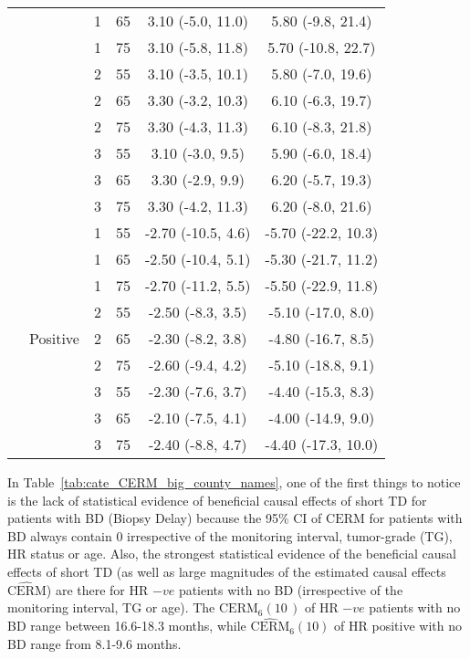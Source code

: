 \documentclass[aoas]{imsart}
\theoremstyle{plain}
\theoremstyle{definition}
\begin{document}
\begin{table}[htbp]
\begin{tabular}{l|l|cccc}
 &  & 1 & 65 & 3.10 (-5.0, 11.0) & 5.80 (-9.8, 21.4) \\
 &  & 1 & 75 & 3.10 (-5.8, 11.8) & 5.70 (-10.8, 22.7) \\
 &  & 2 & 55 & 3.10 (-3.5, 10.1) & 5.80 (-7.0, 19.6) \\
 &  & 2 & 65 & 3.30 (-3.2, 10.3) & 6.10 (-6.3, 19.7) \\
 &  & 2 & 75 & 3.30 (-4.3, 11.3) & 6.10 (-8.3, 21.8) \\
 &  & 3 & 55 & 3.10 (-3.0, 9.5) & 5.90 (-6.0, 18.4) \\
 &  & 3 & 65 & 3.30 (-2.9, 9.9) & 6.20 (-5.7, 19.3) \\
 &  & 3 & 75 & 3.30 (-4.2, 11.3) & 6.20 (-8.0, 21.6) \\
\cline{2-6}
 & \multirow{9}{*}{Positive} & 1 & 55 & -2.70 (-10.5, 4.6) & -5.70 (-22.2, 10.3) \\
 &  & 1 & 65 & -2.50 (-10.4, 5.1) & -5.30 (-21.7, 11.2) \\
 &  & 1 & 75 & -2.70 (-11.2, 5.5) & -5.50 (-22.9, 11.8) \\
 &  & 2 & 55 & -2.50 (-8.3, 3.5) & -5.10 (-17.0, 8.0) \\
 &  & 2 & 65 & -2.30 (-8.2, 3.8) & -4.80 (-16.7, 8.5) \\
 &  & 2 & 75 & -2.60 (-9.4, 4.2) & -5.10 (-18.8, 9.1) \\
 &  & 3 & 55 & -2.30 (-7.6, 3.7) & -4.40 (-15.3, 8.3) \\
 &  & 3 & 65 & -2.10 (-7.5, 4.1) & -4.00 (-14.9, 9.0) \\
 &  & 3 & 75 & -2.40 (-8.8, 4.7) & -4.40 (-17.3, 10.0) \\
\hline
\end{tabular}
\end{table}
In Table~\ref{tab:cate_CERM_big_county_names}, one of the first things to notice is the lack of statistical evidence of beneficial causal effects of short TD for patients with BD (Biopsy Delay) because the 95\% CI of $\text{CERM}$ for patients with BD always contain $0$ irrespective of the monitoring interval, tumor-grade (TG), HR status or age. Also, the strongest statistical evidence of the beneficial causal effects of short TD (as well as large magnitudes of the estimated causal effects $\widehat{\text{CERM}}$) are there for HR $-ve$ patients with no BD (irrespective of the monitoring interval, TG or age). The ${\text{CERM}}_{6}(10\,)$ of HR $-ve$ patients with no BD range between 16.6-18.3 months, while  $\widehat{\text{CERM}}_{6}(10)$ of HR positive with no BD range from 8.1-9.6 months. 
\end{document}
